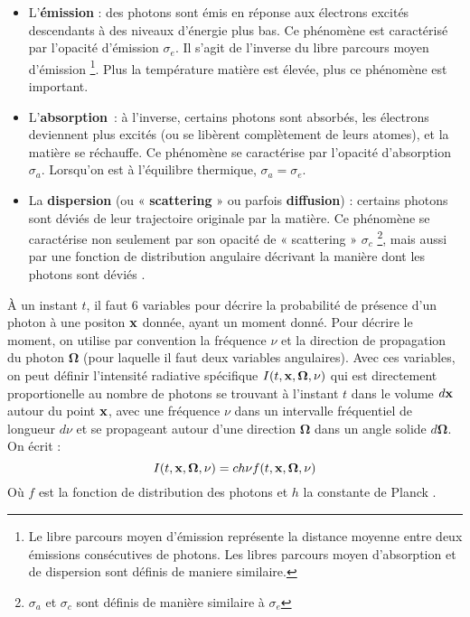 \begin{itemize}
 \item L'\textbf{émission} : des photons sont émis en réponse aux électrons excités descendants à des niveaux d'énergie plus bas. Ce phénomène est caractérisé par l'opacité d'émission $\sigma_e$. Il s'agit de l'inverse du libre parcours moyen d'émission \footnote{Le libre parcours moyen d'émission représente la distance moyenne entre deux émissions consécutives de photons. Les libres parcours moyen d'absorption et de dispersion sont définis de maniere similaire.}. Plus la température matière est élevée, plus ce phénomène est important.
 \item L'\textbf{absorption} : à l'inverse, certains photons sont absorbés, les électrons deviennent plus excités (ou se libèrent complètement de leurs atomes), et la matière se réchauffe. Ce phénomène se caractérise par l'opacité d'absorption $\sigma_a$. Lorsqu'on est à l'équilibre thermique, $\sigma_a = \sigma_e$.
 \item La \textbf{dispersion} (ou « \textbf{scattering} » ou parfois \textbf{diffusion}) : certains photons sont déviés de leur trajectoire originale par la matière. Ce phénomène se caractérise non seulement par son opacité de « scattering » $\sigma_c$ \footnote{ $\sigma_a$ et $\sigma_c$ sont définis de manière similaire à $\sigma_e$}, mais aussi par une fonction de distribution angulaire décrivant la manière dont les photons sont déviés \parencite[13]{Reference3}.
\end{itemize}

À un instant $t$, il faut 6 variables pour décrire la probabilité de présence d'un photon à une positon $\mathbf{x}$ donnée, ayant un moment donné. Pour décrire le moment, on utilise par convention la fréquence $\nu$ et la direction de propagation du photon $\bm{\Omega}$ (pour laquelle il faut deux variables angulaires). Avec ces variables, on peut définir l'intensité radiative spécifique $I(t, \mathbf{x}, \bm{\Omega}, \nu)$ qui est directement proportionelle au nombre de photons se trouvant à l'instant $t$ dans le volume $d\mathbf{x}$ autour du point $\mathbf{x}$, avec une fréquence $\nu$ dans un intervalle fréquentiel de longueur $d\nu$ et se propageant autour d'une direction $\bm{\Omega}$ dans un angle solide $d\bm{\Omega}$. On écrit : $$I(t, \mathbf{x}, \bm{\Omega}, \nu) = ch\nu f(t, \mathbf{x}, \bm{\Omega}, \nu) $$
Où $f$ est la fonction de distribution des photons et $h$ la constante de Planck \parencite[14]{Reference3}.


